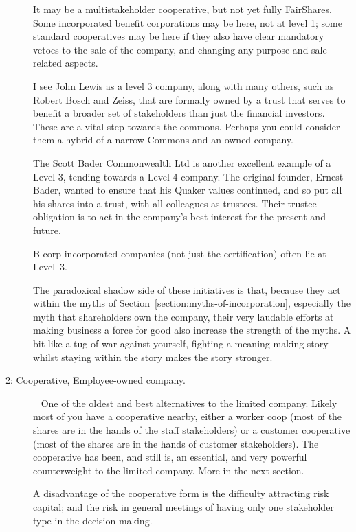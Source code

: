 \begin{description}
It may be a multistakeholder cooperative, but not yet fully FairShares. Some incorporated benefit corporations may be here, not at level 1; some standard cooperatives may be here if they also have clear mandatory vetoes to the sale of the company, and changing any purpose and sale-related aspects. 


I see John Lewis as a level 3 company, along with many others, such as Robert Bosch and Zeiss, that are formally owned by a trust that serves to benefit a broader set of stakeholders than just the financial investors. These are a vital step towards the commons. Perhaps you could consider them a hybrid of a narrow Commons and an owned company.


The Scott Bader Commonwealth Ltd  is another excellent example of a Level 3, tending towards a Level 4 company. The original founder, Ernest Bader, wanted to ensure that his Quaker values continued, and so put all his shares into a trust, with all colleagues as trustees. Their trustee obligation is to act in the company’s best interest for the present and future. 


B-corp incorporated companies (not just the certification) often lie at Level~3. 


The paradoxical shadow side of these initiatives is that, because they act within the myths of Section~\ref{section:myths-of-incorporation}, especially the myth that shareholders own the company, their very laudable efforts at making business a force for good also increase the strength of the myths. A bit like a tug of war against yourself, fighting a meaning\hyp{}making story whilst staying within the story makes the story stronger.


\item[2: Cooperative, Employee-owned company.] ~\newline
One of the oldest and best alternatives to the limited company. Likely most of you have a cooperative nearby, either a worker coop (most of the shares are in the hands of the staff stakeholders) or a customer cooperative (most of the shares are in the hands of customer stakeholders). The cooperative has been, and still is, an essential, and very powerful counterweight to the limited company. More in the next section.


A disadvantage of the cooperative form is the difficulty attracting risk capital; and the risk in general meetings of having only one stakeholder type in the decision making.



\end{description}
